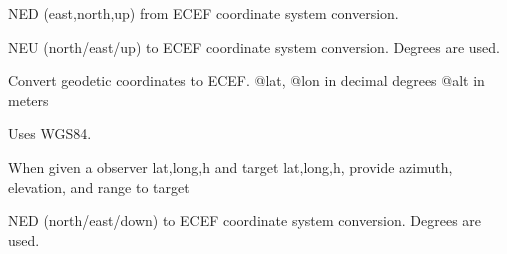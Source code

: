\documentclass[letterpaper,10pt,english]{sphinxmanual}
\begin{document}

\begin{fulllineitems}
\label{\detokenize{modules/coord:coord.ecef2local}}
NED (east,north,up) from ECEF coordinate system conversion.

\end{fulllineitems}


\begin{fulllineitems}
\label{\detokenize{modules/coord:coord.enu2ecef}}
NEU (north/east/up) to ECEF coordinate system conversion. Degrees are used.

\end{fulllineitems}


\begin{fulllineitems}
\label{\detokenize{modules/coord:coord.geodetic2ecef}}
Convert geodetic coordinates to ECEF.
@lat, @lon in decimal degrees
@alt in meters

Uses WGS84.

\end{fulllineitems}


\begin{fulllineitems}
\label{\detokenize{modules/coord:coord.geodetic_to_az_el_r}}
When given a observer lat,long,h and target lat,long,h, provide azimuth, elevation, and range to target

\end{fulllineitems}


\begin{fulllineitems}
\label{\detokenize{modules/coord:coord.ned2ecef}}
NED (north/east/down) to ECEF coordinate system conversion. Degrees are used.

\end{fulllineitems}
\end{document}
